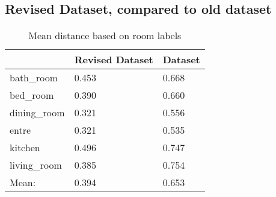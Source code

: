 \subsection*{Revised Dataset, compared to old dataset} \label{appendix: E}

\begin{table}[H]
\begin{tabular}{lll}
                               & Revised Dataset  & Dataset  \\ \hline
\multicolumn{1}{|l|}{bath\_room}   & \multicolumn{1}{l|}{0.453}                                        & \multicolumn{1}{l|}{0.668}                                       \\ \hline
\multicolumn{1}{|l|}{bed\_room}    & \multicolumn{1}{l|}{0.390}                                          & \multicolumn{1}{l|}{0.660}                                        \\ \hline
\multicolumn{1}{|l|}{dining\_room} & \multicolumn{1}{l|}{0.321}                                         & \multicolumn{1}{l|}{0.556}                                       \\ \hline
\multicolumn{1}{|l|}{entre}        & \multicolumn{1}{l|}{0.321}                                        & \multicolumn{1}{l|}{0.535}                                       \\ \hline
\multicolumn{1}{|l|}{kitchen}      & \multicolumn{1}{l|}{0.496}                                       & \multicolumn{1}{l|}{0.747}                                       \\ \hline
\multicolumn{1}{|l|}{living\_room} & \multicolumn{1}{l|}{0.385}                                         & \multicolumn{1}{l|}{0.754}                                       \\ \hline
Mean:                              & 0.394                                                           & 0.653
\end{tabular}
\caption{Mean distance based on room labels}
\end{table}
